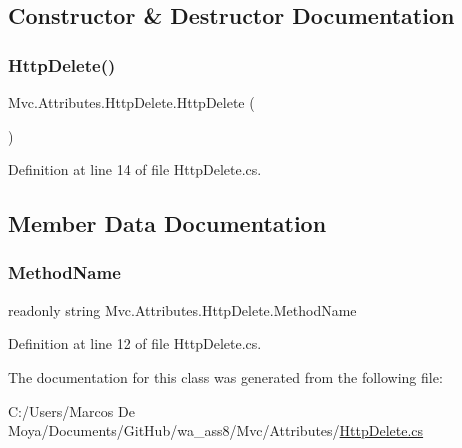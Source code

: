 \subsection{Constructor \& Destructor Documentation}
\mbox{\label{class_mvc_1_1_attributes_1_1_http_delete_ad79f2f1f7284e03812dc930e80cf4724}} 
\subsubsection{\texorpdfstring{Http\+Delete()}{HttpDelete()}}
{\footnotesize\ttfamily Mvc.\+Attributes.\+Http\+Delete.\+Http\+Delete (\begin{DoxyParamCaption}{ }\end{DoxyParamCaption})}



Definition at line 14 of file Http\+Delete.\+cs.



\subsection{Member Data Documentation}
\mbox{\label{class_mvc_1_1_attributes_1_1_http_delete_ae5e51443f46f5ac296aa709ffce3bb34}} 
\subsubsection{\texorpdfstring{Method\+Name}{MethodName}}
{\footnotesize\ttfamily readonly string Mvc.\+Attributes.\+Http\+Delete.\+Method\+Name}



Definition at line 12 of file Http\+Delete.\+cs.



The documentation for this class was generated from the following file\+:\begin{DoxyCompactItemize}
\item 
C\+:/\+Users/\+Marcos De Moya/\+Documents/\+Git\+Hub/wa\+\_\+ass8/\+Mvc/\+Attributes/\hyperlink{_http_delete_8cs}{Http\+Delete.\+cs}\end{DoxyCompactItemize}

